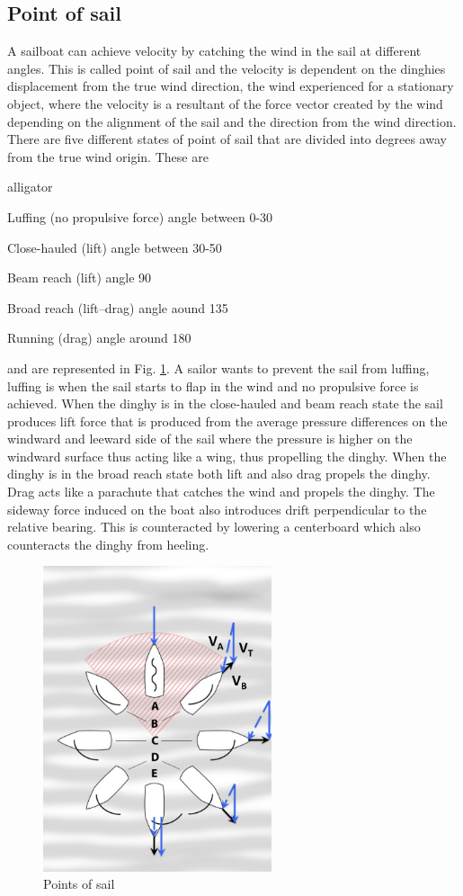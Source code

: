 \subsection{Point of sail}
A sailboat can achieve velocity by catching the wind in the sail at different angles. This is called point of sail and the velocity is dependent on the dinghies displacement from the true wind direction, the wind experienced for a stationary object, where the velocity is a resultant of the force vector created by the wind depending on the alignment of the sail and the direction from the wind direction. There are five different states of point of sail that are divided into degrees away from the true wind origin. These are
\begin{labeling}{alligator}
\item [Luffing] (no propulsive force) angle between 0-30\degree
\item [Close-hauled] (lift) angle between 30-50\degree
\item [Beam reach] (lift) angle 90\degree
\item [Broad reach] (lift–drag) angle aound 135\degree
\item [Running] (drag) angle around 180\degree
\end{labeling}
and are represented in Fig. \ref{points-sail}. A sailor wants to prevent the sail from luffing, luffing is when the sail starts to flap in the wind and no propulsive force is achieved. When the dinghy is in the close-hauled and beam reach state the sail produces lift force that is produced from the average pressure differences on the windward and leeward side of the sail where the pressure is higher on the windward surface thus acting like a wing, thus propelling the dinghy. When the dinghy is in the broad reach state both lift and also drag propels the dinghy. Drag acts like a parachute that catches the wind and propels the dinghy. The sideway force induced on the boat also introduces drift perpendicular to the relative bearing. This is counteracted by lowering a centerboard which also counteracts the dinghy from heeling.
\begin{figure}[H]
\centering
\includegraphics[width=0.6\textwidth]{Figures/Points_of_sail.jpg}
\caption{Points of sail}
\label{points-sail}
\end{figure}
